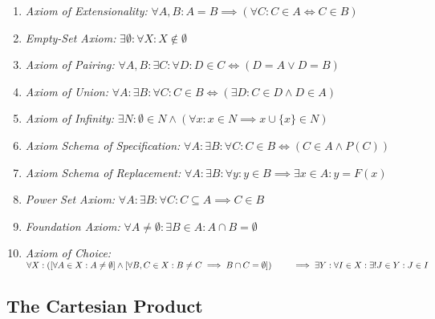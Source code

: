 \begin{enumerate}[label = \Roman*.]
	
	\item \emph{Axiom of Extensionality:} \quad \(\forall A, B: A = B \implies (\forall C: C \in A 
	      \iff C \in B)\)
	
	\item \emph{Empty-Set Axiom:} \quad \(\exists \emptyset : \forall X: X \notin \emptyset\)
	
	\item \emph{Axiom of Pairing:} \quad \(\forall A, B: \exists C: \forall D: D \in C \iff (D = A \lor 
	      D = B)\)	
	
	\item \emph{Axiom of Union:} \quad \(\forall A: \exists B: \forall C: C \in B \iff (\exists D: C 
	      \in D \land D \in A)\)
	
	\item \emph{Axiom of Infinity:} \quad \(\exists N: \emptyset \in N \land (\forall x: x \in N \implies 
	      x \cup \{x\} \in N)\)
	
	\item \emph{Axiom Schema of Specification:} \quad \(\forall A: \exists B: \forall C: C \in B \iff 
	      (C \in A \land P(C))\)
	
	\item \emph{Axiom Schema of Replacement:} \quad \(\forall A: \exists B: \forall y: y \in B \implies 
	      \exists x \in A: y = F(x)\)
	
	\item \emph{Power Set Axiom:} \quad \(\forall A: \exists B: \forall C: C \subseteq A \implies C \in B\)
	
	\item \emph{Foundation Axiom:} \quad \(\forall A \ne \emptyset: \exists B \in A: A \cap B = \emptyset\)
	
	\item \emph{Axiom of Choice:} \quad \(\forall X:
		      \left( \left[ \forall A \in X: A \ne \emptyset \right] \land
		      \left[ \forall B, C \in X: B \ne C \implies B \cap C = \emptyset \right] \right) \\
		      \qquad \implies \exists Y: \forall I \in X: \exists! J \in Y: J \in I\)

			\end{enumerate}

\subsection{The Cartesian Product}

